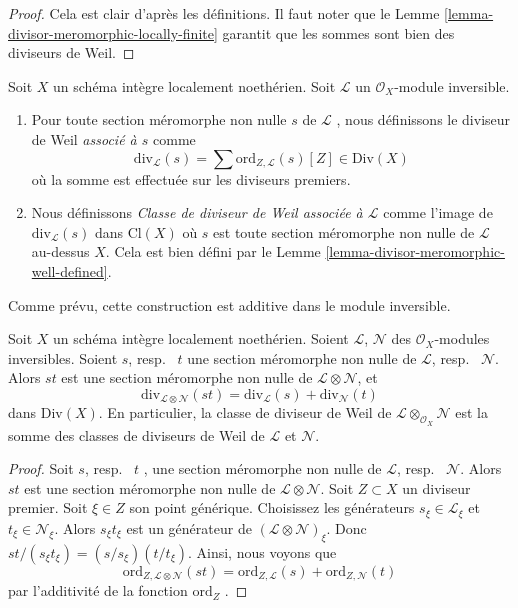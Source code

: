\begin{proof}
Cela est clair d'après les définitions. Il faut noter que le Lemme  \ref{lemma-divisor-meromorphic-locally-finite} 
garantit que les sommes sont bien des diviseurs de Weil.
\end{proof}

\begin{definition}
\label{definition-divisor-invertible-sheaf}
Soit  $X$  un schéma intègre localement noethérien. Soit  $\mathcal{L}$  un
 $\mathcal{O}_X$-module inversible.
\begin{enumerate}
\item Pour toute section méromorphe non nulle  $s$  de  $\mathcal{L}$ , nous
définissons le diviseur de Weil  {\it  associé à
 $s$}  comme
$$
\text{div}_\mathcal{L}(s) =
\sum \text{ord}_{Z, \mathcal{L}}(s) [Z] \in \text{Div}(X)
$$
où la somme est effectuée sur les diviseurs premiers.
\item Nous définissons  {\it Classe de diviseur de Weil associée
à $\mathcal{L}$} comme l'image
de $\text{div}_\mathcal{L}(s)$ dans $\text{Cl}(X)$ où $s$ est toute section méromorphe non nulle
de $\mathcal{L}$ au-dessus $X$. Cela est bien défini par le
Lemme \ref{lemma-divisor-meromorphic-well-defined}.
\end{enumerate}
\end{definition}

\noindent
Comme prévu, cette construction est additive dans le module inversible.

\begin{lemma}
\label{lemma-c1-additive}
Soit  $X$  un schéma intègre localement noethérien. Soient  $\mathcal{L}$,
 $\mathcal{N}$  des  $\mathcal{O}_X$-modules inversibles. Soient  $s$, resp.
\ $t$  une section méromorphe non nulle de  $\mathcal{L}$, resp.
\ $\mathcal{N}$. Alors  $st$  est une section méromorphe non nulle
de  $\mathcal{L} \otimes \mathcal{N}$, et
$$
\text{div}_{\mathcal{L} \otimes \mathcal{N}}(st)
=
\text{div}_\mathcal{L}(s) + \text{div}_\mathcal{N}(t)
$$
dans  $\text{Div}(X)$. En particulier, la classe de diviseur de Weil de  $\mathcal{L} \otimes_{\mathcal{O}_X} \mathcal{N}$ 
est la somme des classes de diviseurs de Weil de  $\mathcal{L}$  et  $\mathcal{N}$.
\end{lemma}

\begin{proof}
Soit  $s$, resp. \ $t$ , une section méromorphe non
nulle de  $\mathcal{L}$, resp. \ $\mathcal{N}$. Alors  $st$  est une
section méromorphe non nulle de  $\mathcal{L} \otimes \mathcal{N}$. Soit  $Z \subset X$  un diviseur
premier. Soit  $\xi \in Z$  son point générique. Choisissez les générateurs
 $s_\xi \in \mathcal{L}_\xi$ et  $t_\xi \in \mathcal{N}_\xi$. Alors  $s_\xi t_\xi$  est un générateur de
 $(\mathcal{L} \otimes \mathcal{N})_\xi$. Donc  $st/(s_\xi t_\xi) = (s/s_\xi)(t/t_\xi)$. Ainsi, nous voyons que
$$
\text{ord}_{Z, \mathcal{L} \otimes \mathcal{N}}(st)
=
\text{ord}_{Z, \mathcal{L}}(s) + \text{ord}_{Z, \mathcal{N}}(t)
$$
par l'additivité de la fonction  $\text{ord}_Z$ .
\end{proof}

